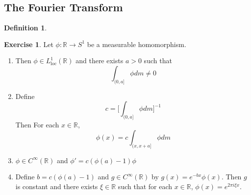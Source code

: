 \documentclass[12pt]{amsart}
\theoremstyle{definition}
\newtheorem{defn}[definition]{Definition}
\newtheorem{ex}[definition]{Exercise}
\newcommand{\R}{\mathbb{R}}
\newcommand{\loc}{\text{loc}}
\newcommand{\lex}[1]{\label{ex:#1}}
\begin{document}
	
	
	
	
	
	
	
	
	\newpage
	\subsection{The Fourier Transform}
	
	\begin{defn}
	
	\end{defn}	
	
	\begin{ex}
	\lex{300} Let $\phi:\R \rightarrow S^1$ be a measurable homomorphism. 
	\begin{enumerate}
	\item Then $\phi \in L^1_{\loc}(\R)$ and there exists $a > 0$ such that $$\int_{(0,a]}\phi dm \neq 0$$
	\item Define $$c = \bigg[ \int_{(0,a]}\phi dm \bigg]^{-1}$$ 
	Then  For each $x \in \R$, $$\phi(x) = c\int_{(x, x+a]}\phi dm$$ 
	\item $\phi \in C^{\infty}(\R)$ and $\phi' = c(\phi(a) - 1)\phi$
	\item Define $b = c(\phi(a) - 1)$ and $g \in C^{\infty}(\R)$ by $g(x) = e^{-bx} \phi(x)$. Then $g$ is constant and there exists $\xi \in \R$ such that for each $x \in \R$, $\phi(x) = e^{2 \pi i \xi x}$.
	\end{enumerate}
	\end{ex}	
	
\end{document}
